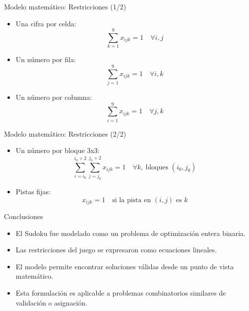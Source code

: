 \documentclass{beamer}
\begin{document}
\begin{frame}{Modelo matemático: Restricciones (1/2)}
    \begin{itemize}
        \item Una cifra por celda:
        \[ \sum_{k=1}^{9} x_{ijk} = 1 \quad \forall i,j \]
        \item Un número por fila:
        \[ \sum_{j=1}^{9} x_{ijk} = 1 \quad \forall i,k \]
        \item Un número por columna:
        \[ \sum_{i=1}^{9} x_{ijk} = 1 \quad \forall j,k \]
    \end{itemize}
\end{frame}

\begin{frame}{Modelo matemático: Restricciones (2/2)}
    \begin{itemize}
        \item Un número por bloque 3x3:
        \[ \sum_{i=i_0}^{i_0+2} \sum_{j=j_0}^{j_0+2} x_{ijk} = 1 \quad \forall k,\ \text{bloques } (i_0,j_0) \]
        \item Pistas fijas:
        \[ x_{ijk} = 1 \quad \text{si la pista en } (i,j) \text{ es } k \]
    \end{itemize}
\end{frame}

\begin{frame}{Conclusiones}
    \begin{itemize}
        \item El Sudoku fue modelado como un problema de optimización entera binaria.
        \item Las restricciones del juego se expresaron como ecuaciones lineales.
        \item El modelo permite encontrar soluciones válidas desde un punto de vista matemático.
        \item Esta formulación es aplicable a problemas combinatorios similares de validación o asignación.
    \end{itemize}
\end{frame}
\end{document}
